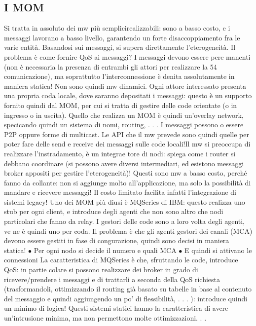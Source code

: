 \subsection{I MOM}
Si tratta in assoluto dei mw più semplicirealizzabili: sono a basso costo, e i
messaggi lavorano a basso livello, garantendo un forte disaccoppiamento fra le
varie entità. Basandosi sui messaggi, si supera direttamente l'eterogeneità.
Il problema è come fornire QoS ai messaggi? I messaggi devono essere pere
manenti (non è necessaria la presenza di entrambi gli attori per realizzare la
54
comunicazione), ma soprattutto l'interconnessione è denita assolutamente in
maniera statica! Non sono quindi mw dinamici.
Ogni attore interessato presenta una propria coda locale, dove saranno depositati i messaggi: questo è un supporto
fornito quindi dal MOM, per cui si
tratta di gestire delle code orientate (o in ingresso o in uscita). Quello che realizza un MOM è quindi un'overlay
network, specicando quindi un sistema di
nomi, routing, . . .
I messaggi possono o essere P2P oppure forme di multicast. Le API che il
mw prevede sono quindi quelle per poter fare delle send e receive dei messaggi
sulle code locali!Il mw si preoccupa di realizzare l'instradamento, è un integrae
tore di nodi: spiega come i router si debbano coordinare (si possono avere diversi
intermediari, ed esistono messaggi broker appositi per gestire l'eterogeneità)!
Questi sono mw a basso costo, perché fanno da collante: non si aggiunge
molto all'applicazione, ma solo la possibilità di mandare e ricevere messaggi! Il
costo limitato facilita infatti l'integrazione di sistemi legacy!
Uno dei MOM più diusi è MQSeries di IBM: questo realizza uno stub per
ogni client, e introduce degli agenti che non sono altro che nodi particolari che
fanno da relay. I gestori delle code sono a loro volta degli agenti, ve ne è quindi
uno per coda. Il problema è che gli agenti gestori dei canali (MCA) devono
essere gestiti in fase di congurazione, quindi sono decisi in maniera statica!
$\bullet$ Per ogni nodo si decide il numero e quali MCA
$\bullet$ E quindi si attivano le connessioni
La caratteristica di MQSeries è che, sfruttando le code, introduce QoS: in partie
colare si possono realizzare dei broker in grado di ricevere/prendere i messaggi e
di trattarli a seconda della QoS richiesta (trasformandoli, ottimizzando il routing già basato su tabelle in base al
contenuto del messaggio e quindi aggiungendo
un po' di flessibilità, . . . ): introduce quindi un minimo di logica!
Questi sistemi statici hanno la caratteristica di avere un'intrusione minima,
ma non permettono molte ottimizzazioni. . .
